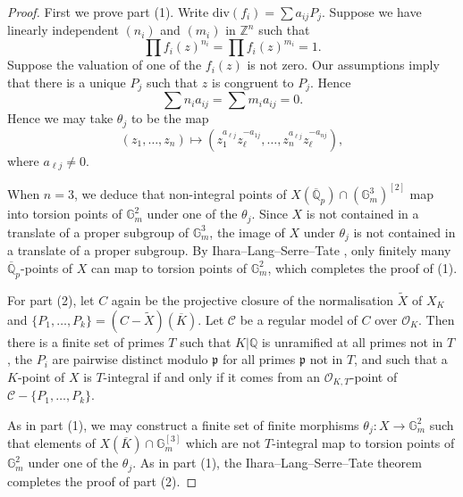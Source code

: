 \documentclass{amsart}
\def\Z{\mathbb Z}
\def\Q{\mathbb Q}
\newcommand{\divv}{\mathrm{div}}
\theoremstyle{definition}
\begin{document}
\begin{proof}
First we prove part (1). Write $\divv (f_i )=\sum a_{ij}P_j $. 
Suppose we have linearly independent $(n_i)$ and $(m_i )$ in $\Z ^n$ such that
\[
\prod f_i (z)^{n_i }=\prod f_i (z)^{m_i }=1.
\]
Suppose the valuation of one of the $f_i (z)$ is not zero. Our assumptions imply that there is a unique $P_j$ such that $z$ is congruent to $P_j$. Hence
\[
\sum n_i a_{ij}=\sum m_i a_{ij}=0.
\]
Hence we may take $\theta _j$ to be the map
\[
(z_1 ,\ldots ,z_n )\mapsto (z_1 ^{a_{\ell j}}z_\ell ^{-a_{1j}},\ldots ,z_n ^{a_{\ell j}}z_\ell ^{-a_{nj}}),
\]
where $a_{\ell j}\neq 0$. 

When $n=3$, we deduce that non-integral points of $X(\overline{\Q }_p )\cap (\mathbb{G}_m ^3 )^{[2]}$ map into torsion points of $\mathbb{G}_m ^2 $ under one of the $\theta _j $. Since $X$ is not contained in a translate of a proper subgroup of $\mathbb{G}_m ^3 $, the image of $X$ under $\theta _j$ is not contained in a translate of a proper subgroup. By Ihara--Lang--Serre--Tate \cite{lang}, only finitely many $\overline{\Q }_p $-points of $X$ can map to torsion points of $\mathbb{G}_m ^2 $, which completes the proof of (1).

For part (2), let $C$ again be the projective closure of the normalisation $\widetilde{X}$ of $X_K$ and $\{ P_1 ,\ldots ,P_k \} =(C-\widetilde{X})(\overline{K})$. Let $\mathcal{C}$ be a regular model of $C$ over $\mathcal{O}_K$. Then there is a finite set of primes $T$ such that $K|\Q $ is unramified at all primes not in $T$, the $P_i$ are pairwise distinct modulo $\mathfrak{p}$ for all primes $\mathfrak{p}$ not in $T$, and such that a $K$-point of $X$ is $T$-integral if and only if it comes from an $\mathcal{O}_{K,T}$-point of $\mathcal{C}-\{ P_1 ,\ldots ,P_k \}$.

As in part (1), we may construct a finite set of finite morphisms $\theta _j :X\to \mathbb{G}_m ^2 $ such that elements of $X(\overline{K})\cap \mathbb{G}_m ^{[3]}$ which are not $T$-integral map to torsion points of $\mathbb{G}_m ^2 $ under one of the $\theta _j$. As in part (1), the Ihara--Lang--Serre--Tate theorem completes the proof of part (2).
\end{proof}
\end{document}
